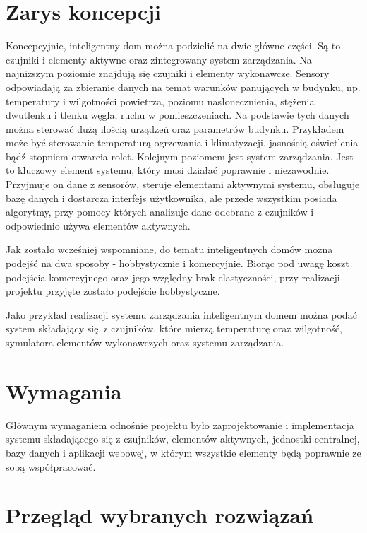 \documentclass[eng,oneside]{mgr}
\begin{document}
\section{Zarys koncepcji}
Koncepcyjnie, inteligentny dom można podzielić na dwie główne części. Są to czujniki i elementy aktywne oraz zintegrowany system zarządzania. Na najniższym poziomie znajdują się czujniki i elementy wykonawcze. Sensory odpowiadają za zbieranie danych na temat warunków panujących w budynku, np. temperatury i wilgotności powietrza, poziomu nasłonecznienia, stężenia dwutlenku i tlenku węgla, ruchu w pomieszczeniach. Na podstawie tych danych można sterować dużą ilością urządzeń oraz parametrów budynku. Przykładem może być sterowanie temperaturą ogrzewania i klimatyzacji, jasnością oświetlenia bądź stopniem otwarcia rolet. Kolejnym poziomem jest system zarządzania. Jest to kluczowy element systemu, który musi działać poprawnie i niezawodnie. Przyjmuje on dane z sensorów, steruje elementami aktywnymi systemu, obsługuje bazę danych i dostarcza interfejs użytkownika, ale przede wszystkim posiada algorytmy, przy pomocy których analizuje dane odebrane z czujników i odpowiednio używa elementów aktywnych.

Jak zostało wcześniej wspomniane, do tematu inteligentnych domów można podejść na dwa sposoby - hobbystycznie i komercyjnie. Biorąc pod uwagę koszt podejścia komercyjnego oraz jego względny brak elastyczności, przy realizacji projektu przyjęte zostało podejście hobbystyczne.

Jako przykład realizacji systemu zarządzania inteligentnym domem można podać system składający się z czujników, które mierzą temperaturę oraz wilgotność, symulatora elementów wykonawczych oraz systemu zarządzania.

\section{Wymagania}
Głównym wymaganiem odnośnie projektu było zaprojektowanie i implementacja systemu składającego się z czujników, elementów aktywnych, jednostki centralnej, bazy danych i aplikacji webowej, w którym wszystkie elementy będą poprawnie ze sobą współpracować.


\section{Przegląd wybranych rozwiązań}
\end{document}
